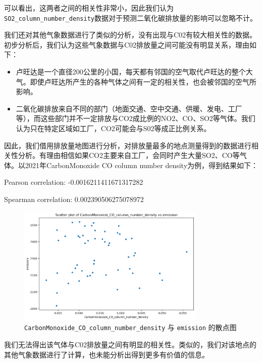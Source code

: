 \documentclass{ctexart}
\begin{document}
可以看出，这两者之间的相关性非常小，因此我们认为\texttt{SO2\_column\_number\_density}数据对于预测二氧化碳排放量的影响可以忽略不计。

我们还对其他气象数据进行了类似的分析，没有出现与C02有较大相关性的数据。初步分析后，我们认为这些气象数据与C02排放量之间可能没有明显关系，理由如下：

\begin{itemize}
      \item 卢旺达是一个直径200公里的小国，每天都有邻国的空气取代卢旺达的整个大气。即使卢旺达所产生的各种气体之间有一定的相关性，也会被邻国的空气所影响。
      \item 二氧化碳排放来自不同的部门（地面交通、空中交通、供暖、发电、工厂等），而这些部门并不一定排放与CO2成比例的NO2、CO、SO2等气体。我们认为只在特定区域如工厂，CO2可能会与S02等成正比例关系。
\end{itemize}

因此，我们借用排放量地图进行分析，对排放量最多的地点测量得到的数据进行相关性分析。有理由相信如果CO2主要来自工厂，会同时产生大量SO2、CO等气体。以2021年CarbonMonoxide CO column number density为例，得到结果如下：

\begin{center}
      Pearson correlation: -0.0016211411671317282

      Spearman correlation: 0.002390506275078972
\end{center}

\begin{figure}[H]
      \centering
      \includegraphics[width=0.8\textwidth]{output7.png}
      \caption{\texttt{CarbonMonoxide\_CO\_column\_number\_density} 与 \texttt{emission} 的散点图}
\end{figure}

我们无法得出该气体与C02排放量之间有明显的相关性。类似的，我们对该地点的其他气象数据进行了计算，也未能分析出得到更多有价值的信息。
\end{document}
